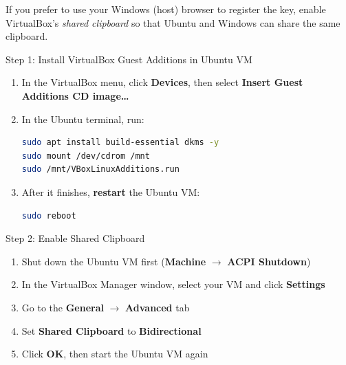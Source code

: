 \documentclass[
    a4paper,
    11pt,
    parskip=half
]{scrartcl}
\begin{document}
If you prefer to use your Windows (host) browser to register the key, enable VirtualBox's \textit{shared clipboard} so that Ubuntu and Windows can share the same clipboard.

\begin{stepbox}{Step 1: Install VirtualBox Guest Additions in Ubuntu VM}
\begin{enumerate}
    \item In the VirtualBox menu, click \textbf{Devices}, then select \textbf{Insert Guest Additions CD image\ldots}

    \item In the Ubuntu terminal, run:
\begin{lstlisting}[language=bash]
sudo apt install build-essential dkms -y
sudo mount /dev/cdrom /mnt
sudo /mnt/VBoxLinuxAdditions.run
\end{lstlisting}

    \item After it finishes, \textbf{restart} the Ubuntu VM:
\begin{lstlisting}[language=bash]
sudo reboot
\end{lstlisting}
\end{enumerate}
\end{stepbox}

\begin{stepbox}{Step 2: Enable Shared Clipboard}
\begin{enumerate}
    \item Shut down the Ubuntu VM first (\textbf{Machine} $\to$ \textbf{ACPI Shutdown})
    \item In the VirtualBox Manager window, select your VM and click \textbf{Settings}
    \item Go to the \textbf{General} $\to$ \textbf{Advanced} tab
    \item Set \textbf{Shared Clipboard} to \textbf{Bidirectional}
    \item Click \textbf{OK}, then start the Ubuntu VM again
\end{enumerate}
\end{stepbox}
\end{document}
